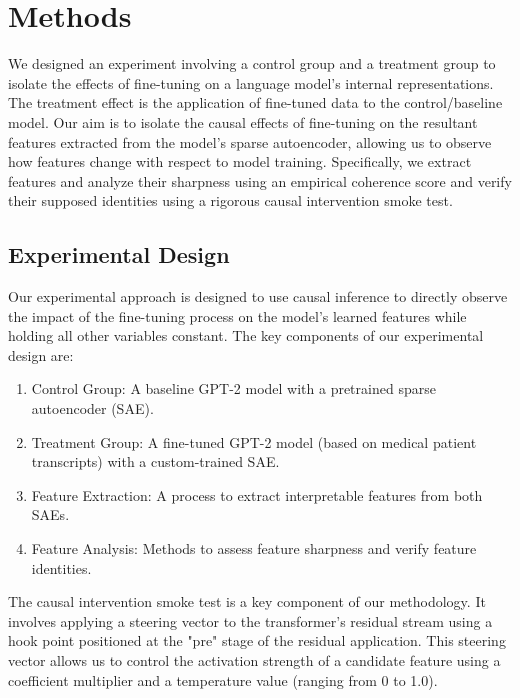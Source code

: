 \section{Methods}

We designed an experiment involving a control group and a treatment group to isolate the effects of fine-tuning on a language model's internal representations. The treatment effect is the application of fine-tuned data to the control/baseline model. Our aim is to isolate the causal effects of fine-tuning on the resultant features extracted from the model's sparse autoencoder, allowing us to observe how features change with respect to model training. Specifically, we extract features and analyze their sharpness using an empirical coherence score and verify their supposed identities using a rigorous causal intervention smoke test.

\subsection{Experimental Design}

Our experimental approach is designed to use causal inference to directly observe the impact of the fine-tuning process on the model's learned features while holding all other variables constant. The key components of our experimental design are:

\begin{enumerate}
    \item Control Group: A baseline GPT-2 model with a pretrained sparse autoencoder (SAE).

    \item Treatment Group: A fine-tuned GPT-2 model (based on medical patient transcripts) with a custom-trained SAE.

    \item Feature Extraction: A process to extract interpretable features from both SAEs.

    \item Feature Analysis: Methods to assess feature sharpness and verify feature identities.
\end{enumerate}

The causal intervention smoke test is a key component of our methodology. It involves applying a steering vector to the transformer's residual stream using a hook point positioned at the "pre" stage of the residual application. This steering vector allows us to control the activation strength of a candidate feature using a coefficient multiplier and a temperature value (ranging from 0 to 1.0).

